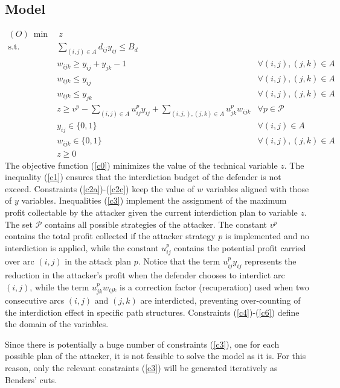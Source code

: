 \documentclass{article}
\begin{document}
\subsection{Model}\label{mo}
\begin{align}
    (O) \  \min &\ z\label{c0} \\
    \text{s.t.} & \sum_{(i,j) \in A} d_{ij} y_{ij} \leq B_{d} \label{c1} \\
    & w_{ijk} \geq y_{ij} + y_{jk} - 1 & \forall (i,j), (j,k) \in A \label{c2a} \\
    & w_{ijk} \le y_{ij}  & \forall (i,j), (j,k) \in A \label{c2b} \\
    & w_{ijk} \le y_{jk} & \forall (i,j), (j,k) \in A \label{c2c} \\
    & z \geq v^p - \sum_{(i,j) \in A} u_{ij}^p y_{ij} + \sum_{(i,j,), (j,k) \in A} u_{jk}^p w_{ijk} & \forall p \in \mathcal{P} \label{c3} \\
    & y_{ij} \in \{0, 1\} & \forall (i,j) \in A \label{c4} \\
    &  w_{ijk} \in \{0, 1\} & \forall (i,j), (j,k) \in A\label{c5} \\
    & z \geq 0  \label{c6} 
\end{align}
The objective function (\ref{c0}) minimizes the value of the technical variable $z$.
The inequality (\ref{c1}) ensures that the interdiction budget of the defender is not exceed.
Constraints  (\ref{c2a})-(\ref{c2c}) keep the value of $w$ variables aligned with those of $y$ variables.
Inequalities (\ref{c3}) implement the assignment of the maximum profit collectable by the attacker given the current interdiction plan to variable $z$. The set $\mathcal{P}$ contains all possible strategies of the attacker. The constant $v^p$ contains the total profit collected if the attacker strategy $p$ is implemented and no interdiction is applied, while the constant $u^p_{ij}$ contains the potential profit carried over arc $(i,j)$ in the attack plan $p$. Notice that the term $u_{ij}^p y_{ij}$ represents the reduction in the attacker's profit when the defender chooses to interdict arc $(i,j)$, while the term $u^p_{jk} w_{ijk}$ is a correction factor (recuperation) used when two consecutive arcs $(i,j)$ and $(j,k)$ are interdicted, preventing over-counting of the interdiction effect in specific path structures.
Constraints (\ref{c4})-(\ref{c6}) define the domain of the variables.

Since there is potentially a huge number of constraints (\ref{c3}), one for each possible plan of the attacker, it is not feasible to solve the model as it is. For this reason, only the relevant constraints (\ref{c3}) will be generated iteratively as Benders' cuts.
\end{document}
